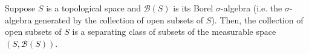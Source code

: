 \begin{corollary}\quad
Suppose $S$ is a topological space and $\mathcal{B}(S)$ is its Borel $\sigma$-algebra
(i.e. the $\sigma$-algebra generated by the collection of open subsets of $S$).
Then, the collection of open subsets of $S$ is a separating class of subsets of
the measurable space $\left(S,\mathcal{B}(S)\right)$.
\end{corollary}

